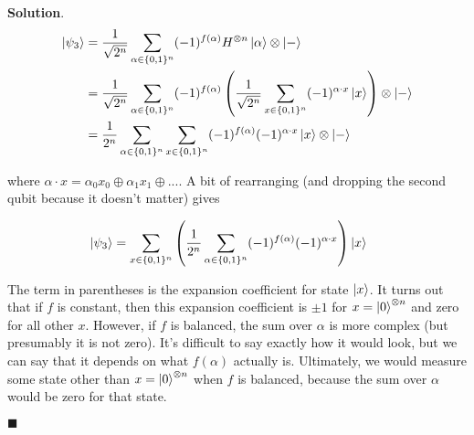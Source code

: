 \documentclass[12pt]{article}
\theoremstyle{definition}
\newenvironment{s}{%
        \begin{trivlist} \item \textbf{Solution}. }{%
            \hspace*{\fill} $\blacksquare$\end{trivlist}}%
\begin{document}
{\begin{s}
\begin{align*}
\ket{\psi_{3}} &= \frac{1}{\sqrt{2^{n}}} \sum_{\alpha\in\{0,1\}^{n}} (-1)^{f(\alpha)}H^{\otimes n}\ket{\alpha}\otimes \ket{-}\\
&= \frac{1}{\sqrt{2^{n}}} \sum_{\alpha\in\{0,1\}^{n}} (-1)^{f(\alpha)} \left(\frac{1}{\sqrt{2^{n}}}\sum_{x\in\{0,1\}^{n}} (-1)^{\alpha\cdot x}\ket{x}\right) \otimes \ket{-}\\
&= \frac{1}{2^{n}}\sum_{\alpha\in\{0,1\}^{n}}\sum_{x\in\{0,1\}^{n}}(-1)^{f(\alpha)}(-1)^{\alpha\cdot x}\ket{x}\otimes \ket{-}\
\end{align*}

where $\alpha\cdot x = \alpha_{0}x_{0} \oplus \alpha_{1}x_{1} \oplus ...$. A bit of rearranging (and dropping the second qubit because it doesn't matter) gives 

\begin{align*}
\ket{\psi_{3}} &= \sum_{x\in\{0,1\}^{n}}\left(\frac{1}{2^{n}}\sum_{\alpha\in\{0,1\}^{n}}(-1)^{f(\alpha)}(-1)^{\alpha\cdot x}\right)\ket{x}\
\end{align*}

The term in parentheses is the expansion coefficient for state $\ket{x}$. It turns out that if $f$ is constant, then this expansion coefficient is $\pm 1$ for $x=\ket{0}^{\otimes n}$ and zero for all other $x$. However, if $f$ is balanced, the sum over $\alpha$ is more complex (but presumably it is not zero). It's difficult to say exactly how it would look, but we can say that it depends on what $f(\alpha)$ actually is. Ultimately, we would measure some state other than $x=\ket{0}^{\otimes n}$ when $f$ is balanced, because the sum over $\alpha$ would be zero for that state.

\end{s}
\end{document}
